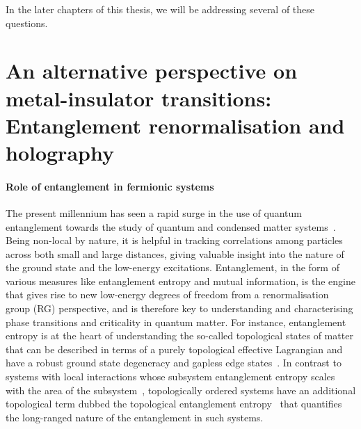 In the later chapters of this thesis, we will be addressing several of these questions.

\section{An alternative perspective on metal-insulator transitions: Entanglement renormalisation and holography}

\paragraph{Role of entanglement in fermionic systems}
The present millennium has seen a rapid surge in the use of quantum entanglement towards the study of quantum and condensed matter systems~\cite{terhal_physicstoday_2003,horodecki2009quantum,eisert_entanglement_2010,laflorencie2016quantum,zeng2019,Erhard2020}.
Being non-local by nature, it is helpful in tracking correlations among particles across both small and large distances, giving valuable insight into the nature of the ground state and the low-energy excitations.
Entanglement, in the form of various measures like entanglement entropy and mutual information, is the engine that gives rise to new low-energy degrees of freedom from a renormalisation group (RG) perspective, and is therefore key to understanding and characterising phase transitions and criticality in quantum matter.
For instance, entanglement entropy is at the heart of understanding the so-called topological states of matter that can be described in terms of a purely topological effective Lagrangian and have a robust ground state degeneracy and gapless edge states~\cite{wen_1990,Wen_fqhe_1990,wen_1990_superc,wen_1991,wen1995topological,Wen2013,wen2017colloquium,tao_1984,niu1985quantized,wen_1989,li2008entanglement,Qi_Andreas_2012,Pollmann_Oshikawa_2010,Yao_Qi_2010,LiuFan2011,CalabreseLefevre2008,LaunchilHaque2010,Schliemann2011,Halperin1982,QiLudwig2012,Laflorencie2016}.
In contrast to systems with local interactions whose subsystem entanglement entropy scales with the area of the subsystem~\cite{das_shankaranarayanan_2006,cramer_eisert_2006,eisert_entanglement_2010}, topologically ordered systems have an additional topological term dubbed the topological entanglement entropy~\cite{Blok_Wen_1990,Read_1990,Rokhsar_Kivelson_1988,Read_Chakraborty_1989,Moessner_Sondhi_2001,Ardonne_Fradkin_2004,levin_wen_2005,kitaev2006topological,Jiang2012,Hamma_Zanardi_2005,Levin_Wen_2006,Kitaev_Preskill_2006,Zhang_Vishwanath_2012,Grover_Vishwanath_2011,Hamma_Lidar_2008,Lan_Wen_2014,Fendley_Troyer_2013,Gu_Wen_2009,Slagle_Willianson_2019} that quantifies the long-ranged nature of the entanglement in such systems.

